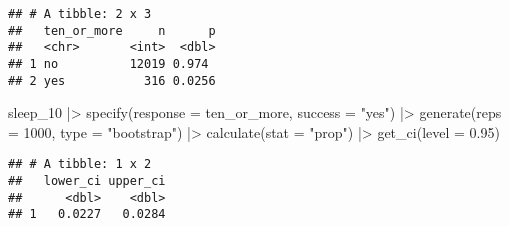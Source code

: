 \documentclass[
]{article}
\newenvironment{Shaded}{\begin{snugshade}}{\end{snugshade}}
\newcommand{\AttributeTok}[1]{\textcolor[rgb]{0.77,0.63,0.00}{#1}}
\newcommand{\DecValTok}[1]{\textcolor[rgb]{0.00,0.00,0.81}{#1}}
\newcommand{\FloatTok}[1]{\textcolor[rgb]{0.00,0.00,0.81}{#1}}
\newcommand{\FunctionTok}[1]{\textcolor[rgb]{0.00,0.00,0.00}{#1}}
\newcommand{\NormalTok}[1]{#1}
\newcommand{\OtherTok}[1]{\textcolor[rgb]{0.56,0.35,0.01}{#1}}
\newcommand{\SpecialCharTok}[1]{\textcolor[rgb]{0.00,0.00,0.00}{#1}}
\newcommand{\StringTok}[1]{\textcolor[rgb]{0.31,0.60,0.02}{#1}}
\begin{document}
\begin{verbatim}
## # A tibble: 2 x 3
##   ten_or_more     n      p
##   <chr>       <int>  <dbl>
## 1 no          12019 0.974 
## 2 yes           316 0.0256
\end{verbatim}

\begin{Shaded}
\begin{Highlighting}[]
\NormalTok{sleep\_10 }\SpecialCharTok{|\textgreater{}}
 \FunctionTok{specify}\NormalTok{(}\AttributeTok{response =}\NormalTok{ ten\_or\_more, }\AttributeTok{success =} \StringTok{"yes"}\NormalTok{) }\SpecialCharTok{|\textgreater{}}
 \FunctionTok{generate}\NormalTok{(}\AttributeTok{reps =} \DecValTok{1000}\NormalTok{, }\AttributeTok{type =} \StringTok{"bootstrap"}\NormalTok{) }\SpecialCharTok{|\textgreater{}}
 \FunctionTok{calculate}\NormalTok{(}\AttributeTok{stat =} \StringTok{"prop"}\NormalTok{) }\SpecialCharTok{|\textgreater{}}
 \FunctionTok{get\_ci}\NormalTok{(}\AttributeTok{level =} \FloatTok{0.95}\NormalTok{)}
\end{Highlighting}
\end{Shaded}

\begin{verbatim}
## # A tibble: 1 x 2
##   lower_ci upper_ci
##      <dbl>    <dbl>
## 1   0.0227   0.0284
\end{verbatim}

\begin{Shaded}
\end{Shaded}
\end{document}
